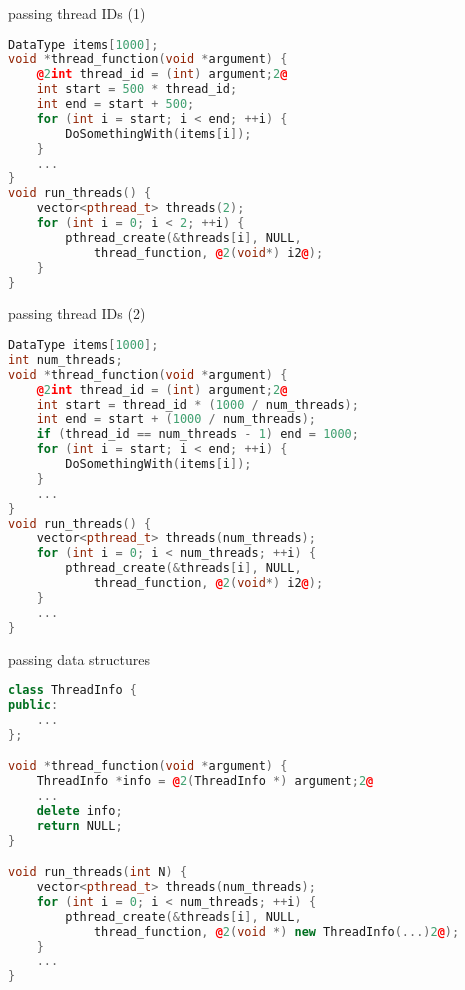 \begin{frame}[fragile,label=pthreadCreatePassingId1]{passing thread IDs (1)}
\begin{lstlisting}[language=C++,style=smaller,
moredelim={**[is][\btHL<2|handout:2>]{@2}{2@}},
]
DataType items[1000];
void *thread_function(void *argument) {
    @2int thread_id = (int) argument;2@
    int start = 500 * thread_id;
    int end = start + 500;
    for (int i = start; i < end; ++i) {
        DoSomethingWith(items[i]);
    }
    ...
}
void run_threads() {
    vector<pthread_t> threads(2);
    for (int i = 0; i < 2; ++i) {
        pthread_create(&threads[i], NULL,
            thread_function, @2(void*) i2@);
    }
}
\end{lstlisting}
\end{frame}

\begin{frame}[fragile,label=pthreadCreatePassingId2]{passing thread IDs (2)}
\begin{lstlisting}[language=C++,style=smaller,
moredelim={**[is][\btHL<2|handout:2>]{@2}{2@}},
]
DataType items[1000];
int num_threads;
void *thread_function(void *argument) {
    @2int thread_id = (int) argument;2@
    int start = thread_id * (1000 / num_threads);
    int end = start + (1000 / num_threads);
    if (thread_id == num_threads - 1) end = 1000;
    for (int i = start; i < end; ++i) {
        DoSomethingWith(items[i]);
    }
    ...
}
void run_threads() {
    vector<pthread_t> threads(num_threads);
    for (int i = 0; i < num_threads; ++i) {
        pthread_create(&threads[i], NULL,
            thread_function, @2(void*) i2@);
    }
    ...
}
\end{lstlisting}
\end{frame}

\begin{frame}[fragile,label=pthreadCreatePassingDS]{passing data structures}
\begin{lstlisting}[language=C++,style=smaller,
moredelim={**[is][\btHL<2|handout:2>]{@2}{2@}},
]
class ThreadInfo {
public:
    ...
};

void *thread_function(void *argument) {
    ThreadInfo *info = @2(ThreadInfo *) argument;2@
    ...
    delete info;
    return NULL;
}

void run_threads(int N) {
    vector<pthread_t> threads(num_threads);
    for (int i = 0; i < num_threads; ++i) {
        pthread_create(&threads[i], NULL,
            thread_function, @2(void *) new ThreadInfo(...)2@);
    }
    ...
}
\end{lstlisting}
\end{frame}
